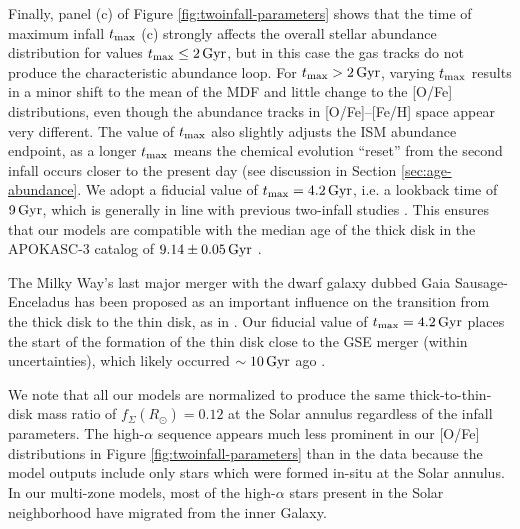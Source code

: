 \documentclass[twocolumn,twocolappendix,linenumbers]{aastex631}
\newcommand{\Gyr}{\,{\rm Gyr}}
\begin{document}
Finally, panel (c) of Figure \ref{fig:twoinfall-parameters} shows that the time of maximum infall $t_{\rm max}$ (c) strongly affects the overall stellar abundance distribution for values $t_{\rm max}\leq2\Gyr$, but in this case the gas tracks do not produce the characteristic abundance loop. For $t_{\rm max}>2\Gyr$, varying $t_{\rm max}$ results in a minor shift to the mean of the MDF and little change to the [O/Fe] distributions, even though the abundance tracks in [O/Fe]--[Fe/H] space appear very different. The value of $t_{\rm max}$ also slightly adjusts the ISM abundance endpoint, as a longer $t_{\rm max}$ means the chemical evolution ``reset'' from the second infall occurs closer to the present day (see discussion in Section \ref{sec:age-abundance}. We adopt a fiducial value of $t_{\rm max}=4.2\Gyr$, i.e. a lookback time of $9\Gyr$, which is generally in line with previous two-infall studies \citep[e.g.,][]{nissen_high-precision_2020,spitoni_galactic_2020,spitoni_apogee_2021}. This ensures that our models are compatible with the median age of the thick disk in the APOKASC-3 catalog of $9.14\pm0.05\Gyr$ \citep{pinsonneault_apokasc-3_2025}. 

The Milky Way's last major merger with the dwarf galaxy dubbed Gaia Sausage-Enceladus \citep[GSE;][]{belokurov_co-formation_2018,helmi_merger_2018} has been proposed as an important influence on the transition from the thick disk to the thin disk, as in \citet{spitoni_remind_2024}. Our fiducial value of $t_{\rm max}=4.2\Gyr$ places the start of the formation of the thin disk close to the GSE merger (within uncertainties), which likely occurred $\sim10\Gyr$ ago \citep[e.g.,][]{helmi_merger_2018,gallart_uncovering_2019,naidu_reconstructing_2021,woody_rapid_2025}.

We note that all our models are normalized to produce the same thick-to-thin-disk mass ratio of $f_{\Sigma}(R_\odot)=0.12$ \citep{bland-hawthorn_galaxy_2016} at the Solar annulus regardless of the infall parameters. The high-$\alpha$ sequence appears much less prominent in our [O/Fe] distributions in Figure \ref{fig:twoinfall-parameters} than in the data because the model outputs include only stars which were formed in-situ at the Solar annulus. In our multi-zone models, most of the high-$\alpha$ stars present in the Solar neighborhood have migrated from the inner Galaxy.
\end{document}
